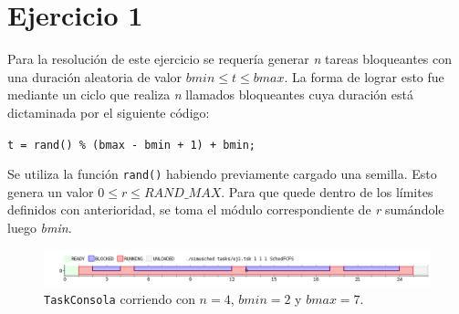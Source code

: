 \section{Ejercicio 1}

Para la resolución de este ejercicio se requería generar \emph{n} tareas
bloqueantes con una duración aleatoria de valor $bmin \leq t \leq bmax$. La forma de
lograr esto fue mediante un ciclo que realiza \emph{n} llamados bloqueantes cuya
duración está dictaminada por el siguiente código:

\begin{center}
	\texttt{t = rand() \% (bmax - bmin + 1) + bmin;}
\end{center}

Se utiliza la función \texttt{rand()} habiendo previamente cargado una semilla.
Esto genera un valor $0 \leq r \leq RAND\_MAX$. Para que quede dentro de los
límites definidos con anterioridad, se toma el módulo correspondiente de
\emph{r} sumándole luego \emph{bmin}.

\begin{figure}[ht]
	\begin{center}
		\includegraphics[width=1\columnwidth]{imagenes/ej1.png}
		\caption{\texttt{TaskConsola} corriendo con $n = 4$, $bmin = 2$ y $bmax
		= 7$.}
	\end{center}
\end{figure}

